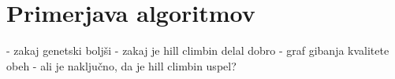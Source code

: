 \documentclass[12pt,a4paper,openany]{book}
\begin{document}
\section{Primerjava algoritmov}
- zakaj genetski boljši
- zakaj je hill climbin delal dobro
- graf gibanja kvalitete obeh
- ali je naključno, da je hill climbin uspel?

\newpage



\listoffigures

\listoftables

\newpage
\end{document}
